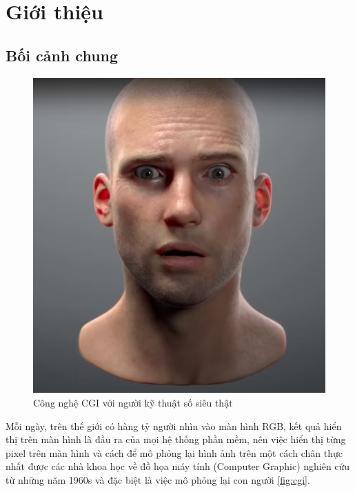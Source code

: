 \chapter{Giới thiệu}
\label{Chapter1}

\section{Bối cảnh chung}

\begin{figure}[h!]
  \centering
  \includegraphics[width=0.5\linewidth]{images/cgi.png}
  \caption{Công nghệ CGI với người kỹ thuật số siêu thật}
  \label{fig:cgi}
\end{figure}

Mỗi ngày, trên thế giới có hàng tỷ người nhìn vào màn hình RGB, kết quả hiển thị trên màn hình là đầu ra của mọi hệ thống phần mềm, nên việc hiển thị từng pixel trên màn hình và cách để mô phỏng lại hình ảnh trên một cách chân thực nhất được các nhà khoa học về đồ họa máy tính (Computer Graphic) nghiên cứu từ những năm 1960s và đặc biệt là việc mô phỏng lại con người \autoref{fig:cgi}. 

